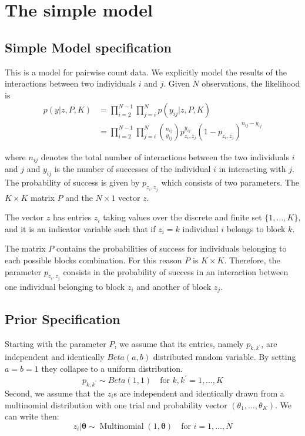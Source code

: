 \documentclass[11pt]{amsart}
\begin{document}
\section{The simple model}

\subsection{Simple Model specification}

This is a model for pairwise count data. We explicitly model the results of the interactions between two individuals $i$ and $j$. Given $N$ observations, the likelihood is 
\begin{align}
p(y| z, P, K) &= \prod_{i =2 }^{N-1} \prod_{j =i}^{N} p(y_{ij} | z, P, K) \\ 
&= \prod_{i =2 }^{N-1} \prod_{j =i}^{N}  {n_{ij} \choose y_{ij}} p_{z_i, z_j}^{y_{ij}}(1- p_{z_i, z_j})^{n_{ij}-y_{ij}}
\end{align}

where $n_{ij}$ denotes the total number of interactions between the two individuals $i$ and $j$ and $y_{ij}$ is the number of successes of the individual $i$ in interacting with $j$. The probability of success is given by $p_{z_i, z_j}$ which consists of two parameters. The $K\times K$ matrix $P$ and the $N \times 1$ vector $z$.

The vector $z$ has entries $z_i$ taking values over the discrete and finite set $\{ 1 , \ldots, K\}$, and it is an indicator variable such that if $z_i = k$ individual $i$ belongs to block $k$. 

The matrix $P$ contains the probabilities of success for individuals belonging to each possible blocks combination. For this reason $P$ is $K\times K$. Therefore, the parameter $p_{z_i, z_j}$ consists in the probability of success in an interaction between one individual belonging to block $z_i$ and another of block $z_j$. 

\subsection{Prior Specification}


Starting with the parameter $P$, we assume that its entries, namely $p_{k,k^\prime}$, are independent and identically $Beta(a,b)$ distributed random variable. By setting $a=b=1$ they collapse to a uniform distribution.
\begin{equation}
p_{k,k^\prime} \sim Beta(1,1) \quad \text{for } k,k^\prime = 1, \ldots,K
\end{equation}
Second, we assume that the $z_i$s are independent and identically drawn from a multinomial distribution with one trial and probability vector $(\theta_1, \dots, \theta_K)$. We can write then:
\begin{equation}
z_i| \boldsymbol{\theta} \sim \operatorname{Multinomial}(1,\boldsymbol{\theta}) \quad \text{for } i = 1, \ldots,N
\end{equation}
\end{document}
